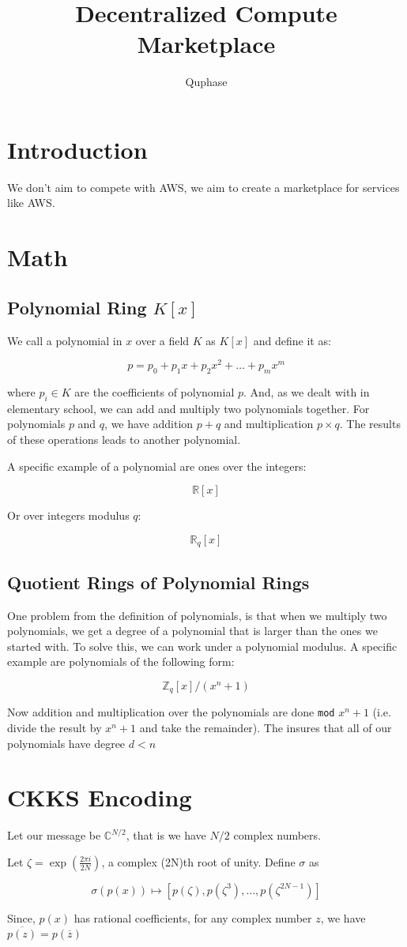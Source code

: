 \documentclass{article}
\title{Decentralized Compute Marketplace}
\author{Quphase}
\date{}
\begin{document}
\maketitle

\section{Introduction}
We don't aim to compete with AWS, we aim to create a marketplace for services like AWS.


\section{Math}
\subsection{Polynomial Ring $K[x]$}

We call a polynomial in $x$ over a field $K$ as $K[x]$ and define it as:

$$p = p_0 + p_1 x + p_2 x^2 + \hdots + p_m x^m$$

where $p_i \in K $ are the coefficients of polynomial $p$. And, as we dealt with in elementary school, we can add and multiply two polynomials together. For polynomials $p$ and $q$, we have addition $p+q$ and multiplication $p \times q$. The results of these operations leads to another polynomial.

A specific example of a polynomial are ones over the integers: 

$$\mathbb{R}[x]$$

Or over integers modulus $q$:

$$\mathbb{R}_q[x]$$



\subsection{Quotient Rings of Polynomial Rings}
One problem from the definition of polynomials, is that when we multiply two polynomials, we get a degree of a polynomial that is larger than the ones we started with. To solve this, we can work under a polynomial modulus. A specific example are polynomials of the following form:

$$\mathbb{Z}_q[x] / (x^n + 1)$$

Now addition and multiplication over the polynomials are done \texttt{mod} $x^n + 1$ (i.e. divide the result by $x^n + 1$ and take the remainder). The insures that all of our polynomials have degree $d < n$


\section{CKKS Encoding}

Let our message be $\mathbb{C}^{N/2}$, that is we have $N/2$ complex numbers.

Let $\zeta = \exp(\frac{2\pi i}{2N})$, a complex (2N)th root of unity. Define $\sigma$ as

$$
\sigma(p(x)) \mapsto [p(\zeta), p(\zeta^3), \hdots, p(\zeta^{2N-1})]
$$

Since, $p(x)$ has rational coefficients, for any complex number $z$, we have $\overline{p(z)} = p(\overline{z})$
\end{document}
